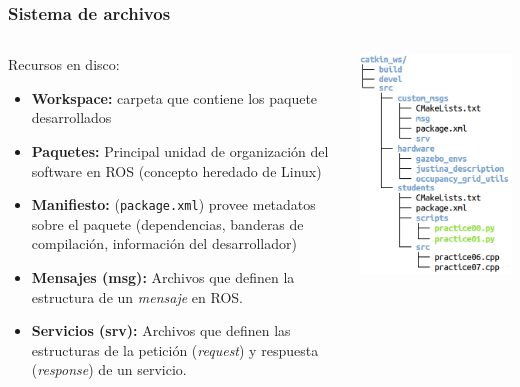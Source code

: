 \begin{frame}\frametitle{Sistema de archivos}
  \begin{columns}
    \begin{column}{0.5\textwidth}
      Recursos en disco:
      \begin{itemize}
      \item \textbf{Workspace:} carpeta que contiene los paquete desarrollados
      \item \textbf{Paquetes:} Principal unidad de organización del software en ROS (concepto heredado de Linux)
      \item \textbf{Manifiesto:} (\texttt{package.xml}) provee metadatos sobre el paquete (dependencias, banderas de compilación, información del desarrollador)
      \item \textbf{Mensajes (msg):} Archivos que definen la estructura de un \textit{mensaje} en ROS.
        \item \textbf{Servicios (srv):} Archivos que definen las estructuras de la petición (\textit{request}) y respuesta (\textit{response}) de un servicio. 
      \end{itemize}
    \end{column}
    \begin{column}{0.4\textwidth}
      \includegraphics[width=\textwidth]{Figures/catkin_tree.png}
    \end{column}
  \end{columns}
\end{frame}


